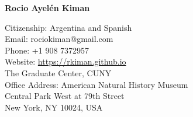 \documentclass[10pt]{cv}
\newcommand{\firstpagestyle}{empty} %
\begin{document}
\thispagestyle{\firstpagestyle} 
\begin{center}
{\LARGE \textbf{\sc Rocio Ayel\'en Kiman}}\\
\bigskip
\bigskip
\end{center}
\normalsize
  
\addresses
{
Citizenship: Argentina and Spanish\\
Email: rociokiman@gmail.com\\
Phone: +1 908 7372957 \\
Website: \url{https://rkiman.github.io}\\
}
{
The Graduate Center, CUNY\\
Office Address: American Natural History Museum\\
Central Park West at 79th Street\\
New York, NY 10024, USA\\ 
\\
}
\end{document}

